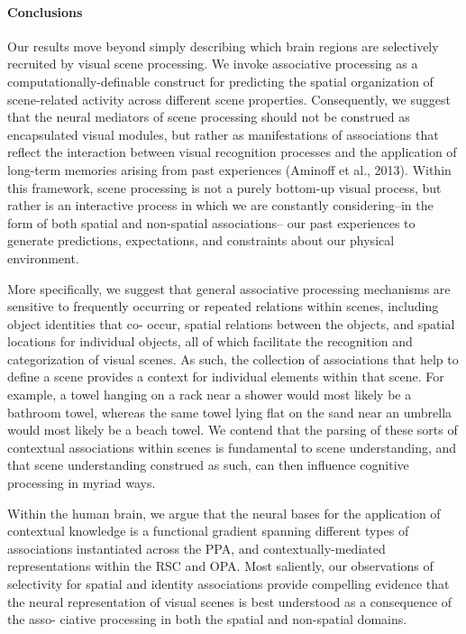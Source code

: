 \documentclass[english]{article}
\begin{document}
\paragraph{Conclusions}

Our results move beyond simply describing which brain regions are selectively
recruited by visual scene processing\citep{aminoff2015associative}.
%
We invoke associative processing as a computationally-definable construct for
predicting the spatial organization of scene-related activity across different
scene properties\citep{aminoff2015associative}.
%
Consequently, we suggest that the neural mediators of scene processing should
not be construed as encapsulated visual modules, but rather as manifestations of
associations that reflect the interaction between visual recognition processes
and the application of long-term memories arising from past experiences (Aminoff
et al., 2013)\citep{aminoff2015associative}.
%
Within this framework, scene processing is not a purely bottom-up visual
process, but rather is an interactive process in which we are constantly
considering–in the form of both spatial and non-spatial associations– our past
experiences to generate predictions, expectations, and constraints about our
physical environment\citep{aminoff2015associative}.

%
More specifically, we suggest that general associative processing mechanisms are
sensitive to frequently occurring or repeated relations within scenes, including
object identities that co- occur, spatial relations between the objects, and
spatial locations for individual objects, all of which facilitate the
recognition and categorization of visual scenes\citep{aminoff2015associative}.
%
As such, the collection of associations that help to define a scene provides a
context for individual elements within that scene\citep{aminoff2015associative}.
%
For example, a towel hanging on a rack near a shower would most likely be a
bathroom towel, whereas the same towel lying flat on the sand near an umbrella
would most likely be a beach towel\citep{aminoff2015associative}.
%
We contend that the parsing of these sorts of contextual associations within
scenes is fundamental to scene understanding, and that scene understanding
construed as such, can then influence cognitive processing in myriad
ways\citep{aminoff2015associative}.

%
Within the human brain, we argue that the neural bases for the application of
contextual knowledge is a functional gradient spanning different types of
associations instantiated across the PPA, and contextually-mediated
representations within the RSC and OPA\citep{aminoff2015associative}.
%
Most saliently, our observations of selectivity for spatial and identity
associations provide compelling evidence that the neural representation of
visual scenes is best understood as a consequence of the asso- ciative
processing in both the spatial and non-spatial
domains\citep{aminoff2015associative}.
\end{document}
